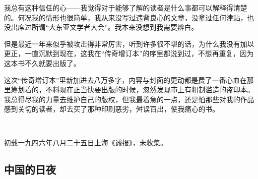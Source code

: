 \par 我总有这种信任的心——我觉得对于能够了解的读者是什么事都可以解释得清楚的。何况我的情形也很简单，我从来没写过违背良心的文章，没拿过任何津贴，也没出席过所谓“大东亚文学者大会”。我本来没想到我需要辨白。
\par 但是最近一年来似乎被攻击得非常厉害，听到许多很不堪的话，为什么我没有加以更正，一直沉默到现在，这我在“传奇增订本”的序里都说到过，不想再重复，因为这本书不久就要出版了。
\par 这次“传奇增订本”里新加进去八万多字，内容与封面的更动都是费了一番心血在那里筹划着的，不料现在正当快要出版的时候，忽然发现市上有粗制滥造的盗印本。我总得尽我的力量去维护自己的版权，但我最着急的一点，还是怕那些对我的作品感到关切的读者，却去买了那种印刷恶劣，舛误百出，使我痛心的书。
\par  
\par *初载一九四六年八月二十五日上海《诚报》，未收集。


\subsection{中国的日夜}



